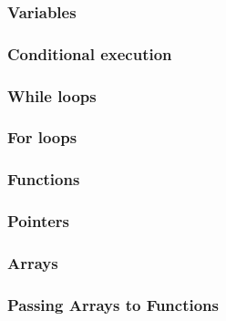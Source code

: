 \documentclass{beamer}
\begin{document}
\begin{frame}
    \frametitle{Variables}
    \begin{figure}
        
    \end{figure}
\end{frame}

\begin{frame}
    \frametitle{Conditional execution}
    \begin{figure}
        
    \end{figure}
\end{frame}

\begin{frame}
    \frametitle{While loops}
    \begin{figure}
        
    \end{figure}
\end{frame}

\begin{frame}
    \frametitle{For loops}
    \begin{figure}
        
    \end{figure}
\end{frame}

\begin{frame}
    \frametitle{Functions}
    \begin{figure}
        
    \end{figure}
\end{frame}

\begin{frame}
    \frametitle{Pointers}
    \begin{figure}
        
    \end{figure}
\end{frame}

\begin{frame}
    \frametitle{Arrays}
    \begin{figure}
        
    \end{figure}
\end{frame}

\begin{frame}
    \frametitle{Passing Arrays to Functions}
    \begin{figure}
        
    \end{figure}
\end{frame}
\end{document}
